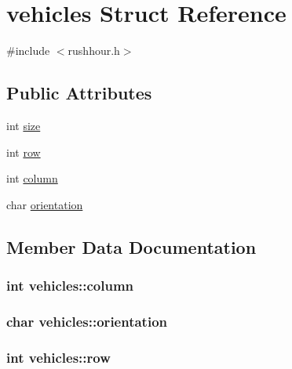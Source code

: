 \hypertarget{structvehicles}{}\section{vehicles Struct Reference}
\label{structvehicles}


{\ttfamily \#include $<$rushhour.\+h$>$}

\subsection*{Public Attributes}
\begin{DoxyCompactItemize}
\item 
int \hyperlink{structvehicles_a1c5f7e33e979bceaf13609a88e10cf62}{size}
\item 
int \hyperlink{structvehicles_a8838c76859f573f35bb160d59809ef87}{row}
\item 
int \hyperlink{structvehicles_a685c75bf5ef178d42b2006a9b66c2798}{column}
\item 
char \hyperlink{structvehicles_a844e878e7685407b4233e2a60a536ddb}{orientation}
\end{DoxyCompactItemize}


\subsection{Member Data Documentation}
\subsubsection[{\texorpdfstring{column}{column}}]{\setlength{\rightskip}{0pt plus 5cm}int vehicles\+::column}\hypertarget{structvehicles_a685c75bf5ef178d42b2006a9b66c2798}{}\label{structvehicles_a685c75bf5ef178d42b2006a9b66c2798}
\subsubsection[{\texorpdfstring{orientation}{orientation}}]{\setlength{\rightskip}{0pt plus 5cm}char vehicles\+::orientation}\hypertarget{structvehicles_a844e878e7685407b4233e2a60a536ddb}{}\label{structvehicles_a844e878e7685407b4233e2a60a536ddb}
\subsubsection[{\texorpdfstring{row}{row}}]{\setlength{\rightskip}{0pt plus 5cm}int vehicles\+::row}\hypertarget{structvehicles_a8838c76859f573f35bb160d59809ef87}{}\label{structvehicles_a8838c76859f573f35bb160d59809ef87}
